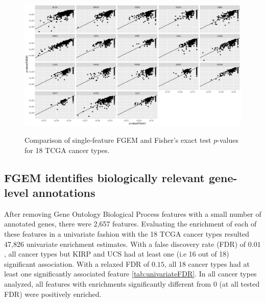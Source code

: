 \begin{figure}
\centering
\includegraphics[width=.9\linewidth]{img/fisher_vs_fgem.png}\label{fig:fisher_vs_fgem}
\caption{Comparison of single-feature FGEM and Fisher's exact test $p$-values for 18 TCGA cancer types.}
\end{figure}

\subsection{FGEM identifies biologically relevant gene-level annotations}
\label{sec:orgd52f2ca}

After removing Gene Ontology Biological Process features with a small number of annotated genes, there were 2,657 features.  Evaluating the enrichment of each of these features in a univariate fashion with the 18 TCGA cancer types resulted 47,826 univariate enrichment estimates.  With a false discovery rate (FDR) of $0.01$, all cancer types but KIRP and UCS had at least one (i.e 16 out of 18) significant association.  With a relaxed FDR of $0.15$, all 18 cancer types had at least one significantly associated feature \ref{tab:univariateFDR}. In all cancer types analyzed, all features with enrichments significantly different from 0 (at all tested FDR)  were positively enriched.  


